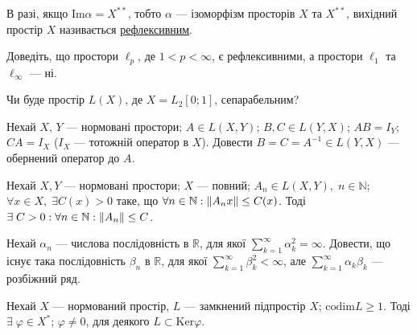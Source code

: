 \begin{theory}
    В разі, якщо $\mathrm{Im}\alpha = X^{**}$, тобто $\alpha$ --- ізоморфізм просторів $X$ та $X^{**}$,
    вихідний простір $X$ називається \underline{рефлексивним}.
\end{theory}

\begin{exercise}
    Доведіть, що простори  $\ell_p$, де $1<p<\infty$, є рефлексивними, а простори $\ell_1$ та $\ell_\infty$ --- ні.
\end{exercise}

\begin{exercise}\label{N:1_1_44}
    Чи буде простір $L(X)$, де $X=L_2[0;1]$, сепарабельним?
\end{exercise}

\begin{exercise}\label{N:1_1_45}
    Нехай $X$, $Y$ --- нормовані простори; $A \in L\left( X, Y\right)$; $B, C \in L\left( Y, X\right)$;
    $AB = I_Y$; $CA = I_X$ ($I_X$ --- тотожній оператор в $X$).
    Довести $B = C = A^{-1} \in L\left( Y, X\right)$ --- обернений оператор до $A$.
\end{exercise}

\begin{theory}
    \begin{theorem*}
        Нехай $X, Y$ --- нормовані простори; $X$ --- повний; $A_n \in L\left( X, Y\right),\; n\in \mathbb{N}$;
        $\forall x \in X, \; \exists C(x) > 0$ таке, що $\forall n \in \mathbb{N}: \left\lVert A_n x\right\rVert \leq C(x)$.
        Тоді $\exists \; C>0: \forall n \in \mathbb{N}: \left\lVert A_n\right\rVert \leq C$.
    \end{theorem*}
\end{theory}

\begin{exercise}\label{N:1_1_46}
    Нехай $\alpha_n$ --- числова послідовність в $\mathbb{R}$, для якої 
    $\sum\limits^\infty_{k=1} \alpha^2_k =\infty$. Довести, що існує така послідовність 
    $\beta_n$ в $\mathbb{R}$, для якої $\sum\limits^\infty_{k=1} \beta^2_k < \infty$, 
    але $\sum\limits^\infty_{k=1} \alpha_k\beta_k$ --- розбіжний ряд.
\end{exercise}

\begin{exercise}
    Нехай $X$ --- нормований простір, $L$ --- замкнений підпростір $X$; $\mathrm{codim}L \geq 1$.
    Тоді $\exists \; \varphi \in X^*$; $\varphi \neq 0$, для деякого $L \subset \mathrm{Ker}\varphi$.
\end{exercise}

